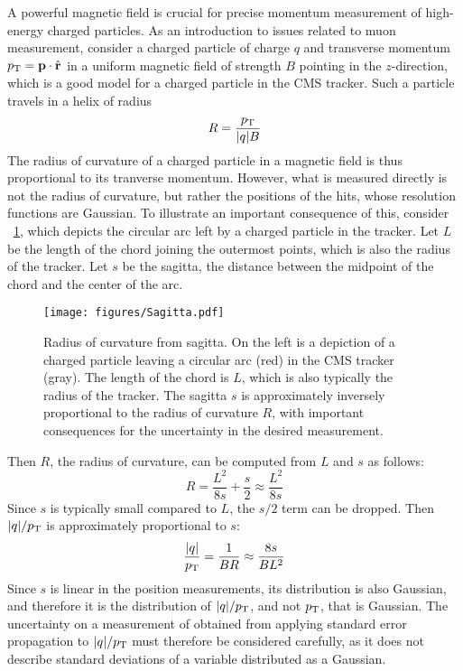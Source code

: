 A powerful magnetic field is crucial for precise momentum measurement of high-energy charged particles.
As an introduction to issues related to muon \pT measurement, consider a charged particle of charge $q$ and transverse momentum $p_{\mathrm{T}} = \mathbf{p} \cdot \hat{\mathbf{r}}$ in a uniform magnetic field of strength $B$ pointing in the $z$-direction, which is a good model for a charged particle in the CMS tracker. Such a particle travels in a helix of radius
\begin{equation}
  R = \frac{p_{\mathrm{T}}}{|q|B}
  \label{cms:radius}
\end{equation}
The radius of curvature of a charged particle in a magnetic field is thus proportional to its tranverse momentum.
However, what is measured directly is not the radius of curvature, but rather the positions of the hits, whose resolution functions are Gaussian.
To illustrate an important consequence of this, consider \Fig~\ref{cms:sagitta}, which depicts the circular arc left by a charged particle in the tracker.
Let $L$ be the length of the chord joining the outermost points, which is also the radius of the tracker.
Let $s$ be the sagitta, \ie the distance between the midpoint of the chord and the center of the arc.
\begin{figure}[tpb]
  \centering
  \texttt{[image: figures/Sagitta.pdf]}
  \caption{Radius of curvature from sagitta. On the left is a depiction of a charged particle leaving a circular arc (red) in the CMS tracker (gray). The length of the chord is $L$, which is also typically the radius of the tracker. The sagitta $s$ is approximately inversely proportional to the radius of curvature $R$, with important consequences for the uncertainty in the desired \pT measurement.}
  \label{cms:sagitta}
\end{figure}
Then $R$, the radius of curvature, can be computed from $L$ and $s$ as follows:
\begin{equation}
  R = \frac{L^2}{8s} + \frac{s}{2} \approx \frac{L^2}{8s}
  \label{cms:eqn_sagitta}
\end{equation}
Since $s$ is typically small compared to $L$, the $s/2$ term can be dropped.
Then $|q|/p_{\mathrm{T}}$ is approximately proportional to $s$:
\begin{align}
  \frac{|q|}{p_{\mathrm{T}}} = \frac{1}{BR} \approx \frac{8s}{BL^2}
  \label{cms:pTError}
\end{align}
Since $s$ is linear in the position measurements, its distribution is also Gaussian, and therefore it is the distribution of $|q|/p_{\mathrm{T}}$, and not $p_{\mathrm{T}}$, that is Gaussian.
The uncertainty on a measurement of \pT obtained from applying standard error propagation to $|q|/p_{\mathrm{T}}$ must therefore be considered carefully, as it does not describe standard deviations of a variable distributed as a Gaussian.

